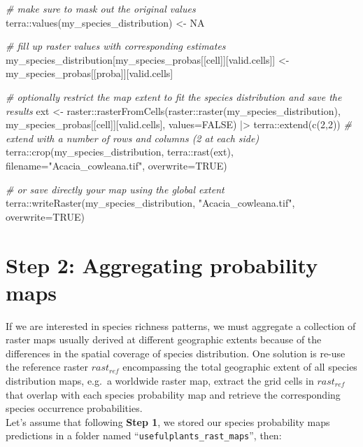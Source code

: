 \documentclass[
]{article}
\newenvironment{Shaded}{\begin{snugshade}}{\end{snugshade}}
\newcommand{\AttributeTok}[1]{\textcolor[rgb]{0.77,0.63,0.00}{#1}}
\newcommand{\CommentTok}[1]{\textcolor[rgb]{0.56,0.35,0.01}{\textit{#1}}}
\newcommand{\ConstantTok}[1]{\textcolor[rgb]{0.00,0.00,0.00}{#1}}
\newcommand{\DecValTok}[1]{\textcolor[rgb]{0.00,0.00,0.81}{#1}}
\newcommand{\FunctionTok}[1]{\textcolor[rgb]{0.00,0.00,0.00}{#1}}
\newcommand{\NormalTok}[1]{#1}
\newcommand{\OtherTok}[1]{\textcolor[rgb]{0.56,0.35,0.01}{#1}}
\newcommand{\SpecialCharTok}[1]{\textcolor[rgb]{0.00,0.00,0.00}{#1}}
\newcommand{\StringTok}[1]{\textcolor[rgb]{0.31,0.60,0.02}{#1}}
\begin{document}
\begin{Shaded}
\begin{Highlighting}[]
\CommentTok{\# make sure to mask out the original values}
\NormalTok{terra}\SpecialCharTok{::}\FunctionTok{values}\NormalTok{(my\_species\_distribution) }\OtherTok{\textless{}{-}} \ConstantTok{NA} 

\CommentTok{\# fill up raster values with corresponding estimates}
\NormalTok{my\_species\_distribution[my\_species\_probas[[}\StringTok{\textquotesingle{}cell\textquotesingle{}}\NormalTok{]][valid.cells]] }\OtherTok{\textless{}{-}} 
\NormalTok{  my\_species\_probas[[}\StringTok{\textquotesingle{}proba\textquotesingle{}}\NormalTok{]][valid.cells]}

\CommentTok{\# optionally restrict the map extent to fit the species distribution and save the results}
\NormalTok{ext }\OtherTok{\textless{}{-}}\NormalTok{ raster}\SpecialCharTok{::}\FunctionTok{rasterFromCells}\NormalTok{(raster}\SpecialCharTok{::}\FunctionTok{raster}\NormalTok{(my\_species\_distribution), }
\NormalTok{                               my\_species\_probas[[}\StringTok{\textquotesingle{}cell\textquotesingle{}}\NormalTok{]][valid.cells], }\AttributeTok{values=}\ConstantTok{FALSE}\NormalTok{) }\SpecialCharTok{|\textgreater{}}
\NormalTok{  terra}\SpecialCharTok{::}\FunctionTok{extend}\NormalTok{(}\FunctionTok{c}\NormalTok{(}\DecValTok{2}\NormalTok{,}\DecValTok{2}\NormalTok{)) }\CommentTok{\# extend with a number of rows and columns (2 at each side)}
\NormalTok{terra}\SpecialCharTok{::}\FunctionTok{crop}\NormalTok{(my\_species\_distribution, terra}\SpecialCharTok{::}\FunctionTok{rast}\NormalTok{(ext), }
            \AttributeTok{filename=}\StringTok{"Acacia\_cowleana.tif"}\NormalTok{, }
            \AttributeTok{overwrite=}\ConstantTok{TRUE}\NormalTok{)}

\CommentTok{\# or save directly your map using the global extent}
\NormalTok{terra}\SpecialCharTok{::}\FunctionTok{writeRaster}\NormalTok{(my\_species\_distribution, }\StringTok{"Acacia\_cowleana.tif"}\NormalTok{, }\AttributeTok{overwrite=}\ConstantTok{TRUE}\NormalTok{)}
\end{Highlighting}
\end{Shaded}

\hypertarget{step-2-aggregating-probability-maps}{%
\section{Step 2: Aggregating probability
maps}\label{step-2-aggregating-probability-maps}}

If we are interested in species richness patterns, we must aggregate a
collection of raster maps usually derived at different geographic
extents because of the differences in the spatial coverage of species
distribution. One solution is re-use the reference raster \(rast_{ref}\)
encompassing the total geographic extent of all species distribution
maps, e.g.~a worldwide raster map, extract the grid cells in
\(rast_{ref}\) that overlap with each species probability map and
retrieve the corresponding species occurrence probabilities.\\
Let's assume that following \textbf{Step 1}, we stored our species
probability maps predictions in a folder named
``\texttt{usefulplants\_rast\_maps}'', then:
\end{document}
